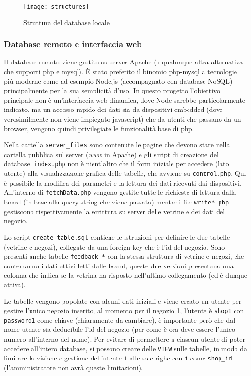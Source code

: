 \begin{figure}[ht]
	\texttt{[image: structures]}
  \caption{Struttura del database locale}
\end{figure}

\subsubsection{Database remoto e interfaccia web}

Il database remoto viene gestito su server Apache (o qualunque altra alternativa che supporti php e mysql). \`E stato preferito il binomio php-mysql a tecnologie pi\`u moderne come ad esempio Node.js (accompagnato con database NoSQL) principalmente per la sua semplicit\`a d'uso. In questo progetto l'obiettivo principale non \`e un'interfaccia web dinamica, dove Node sarebbe particolarmente indicato, ma un accesso rapido dei dati sia da dispositivi embedded (dove verosimilmente non viene impiegato javascript) che da utenti che passano da un browser, vengono quindi privilegiate le funzionalit\`a base di php.

Nella cartella \texttt{server\_files} sono contenute le pagine che devono stare nella cartella pubblica sul server (\textit{www} in Apache) e gli script di creazione del database. \texttt{index.php} non \`e nient'altro che il form iniziale per accedere (lato utente) alla visualizzazione grafica delle tabelle, che avviene su \texttt{control.php}. Qui \`e possibile la modifica dei parametri e la lettura dei dati ricevuti dai dispositivi. All'interno di \texttt{fetchData.php} vengono gestite tutte le richieste di lettura dalla board (in base alla query string che viene passata) mentre i file \texttt{write*.php} gestiscono rispettivamente la scrittura su server delle vetrine e dei dati del negozio.

Lo script \texttt{create\_table.sql} contiene le istruzioni per definire le due tabelle (vetrine e negozi), collegate da una foreign key che \`e l'id del negozio. Sono presenti anche tabelle \texttt{feedback\_*} con la stessa struttura di vetrine e negozi, che conterranno i dati attivi letti dalle board, queste due versioni presentano una colonna che indica se la vetrina ha risposto nell'ultimo collegamento (ed \`e dunque attiva).

Le tabelle vengono popolate con alcuni dati iniziali e viene creato un utente per gestire l'unico negozio inserito, al momento per il negozio 1, l'utente \`e \texttt{shop1} con \texttt{password1} come chiave (chiaramente da cambiare), \`e importante per\`o che dal nome utente sia deducibile l'id del negozio (per come \`e ora deve essere l'unico numero all'interno del nome). Per evitare di permettere a ciascun utente di poter accedere all'intero database, si possono creare delle \texttt{VIEW} sulle tabelle, in modo da limitare la visione e gestione dell'utente \texttt{i} alle sole righe con \texttt{i} come \texttt{shop\_id} (l'amministratore non avr\`a queste limitazioni).

